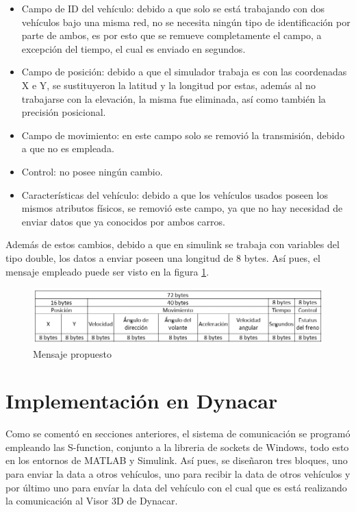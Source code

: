 \begin{itemize}
\item Campo de ID del vehículo: debido a que solo se está trabajando con dos vehículos bajo una misma red, no se necesita ningún tipo de identificación por parte de ambos, es por esto que se remueve completamente el campo, a excepción del tiempo, el cual es enviado en segundos.
\item Campo de posición: debido a que el simulador trabaja es con las coordenadas X e Y, se sustituyeron la latitud y la longitud por estas, además al no trabajarse con la elevación, la misma fue eliminada, así como también la precisión posicional.
\item Campo de movimiento: en este campo solo se removió la transmisión, debido a que no es empleada.
\item Control: no posee ningún cambio.
\item Características del vehículo: debido a que los vehículos usados poseen los mismos atributos físicos, se removió este campo, ya que no hay necesidad de enviar datos que ya conocidos por ambos carros.
\end{itemize}
\par Además de estos cambios, debido a que en simulink se trabaja con variables del tipo double, los datos a enviar poseen una longitud de 8 bytes. Así pues, el mensaje empleado puede ser visto en la figura \ref{fig:mem2}.

\begin{figure}[!h]
	\centering
		\includegraphics[scale=0.6]{Imagenes/mem2}
		\caption{Mensaje propuesto}
		\label{fig:mem2}
	\end{figure}	  

\section{Implementación en Dynacar}
Como se comentó en secciones anteriores, el sistema de comunicación se programó empleando las S-function, conjunto a la libreria de sockets de Windows, todo esto en los entornos de MATLAB y Simulink. Así pues, se diseñaron tres bloques, uno para enviar la data a otros vehículos, uno para recibir la data de otros vehículos y por último uno para envíar la data del vehículo con el cual que es está realizando la comunicación al Visor 3D de Dynacar. 
